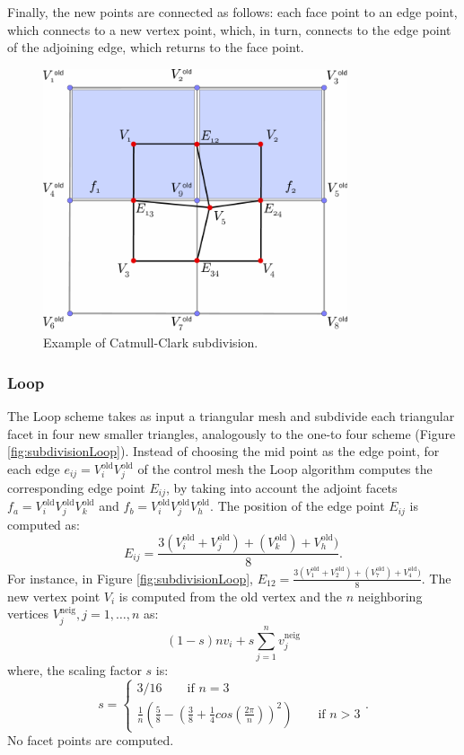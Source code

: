 Finally, the new points are connected as follows: each face point to an edge point, which connects to a new vertex point, which, in turn, connects to the edge point of the adjoining edge, which returns to the face point.


\begin{figure}
\begin{center}
\centering
  \includegraphics[width=0.8\textwidth]{./img/subdivisionCatmull}
 \caption{Example of Catmull-Clark subdivision.}
 \label{fig:subdivisionCatmull}
\end{center}
\end{figure}

\subsubsection{Loop}
The Loop scheme takes as input a triangular mesh and subdivide each triangular facet in four new smaller triangles, analogously to the one-to four scheme (Figure \ref{fig:subdivisionLoop}).
Instead of choosing the mid point as the edge point, for each edge  $e_{ij} = V_i^{\text{old}}V_j^{\text{old}}$ of the control mesh the Loop algorithm computes the corresponding edge point $E_{ij}$, by taking into account the adjoint facets $f_{a} = V_i^{\text{old}}V_j^{\text{old}}V_k^{\text{old}}$ and $f_{b} = V_i^{\text{old}}V_j^{\text{old}}V_h^{\text{old}}$. The position of the edge point $E_{ij}$ is computed as:
\[
E_{ij} = \frac{3(V_i^{\text{old}} + V_j^{\text{old}}) + (V_k^{\text{old}}) + V_h^{\text{old}}) }{8}.
\]
For instance, in Figure \ref{fig:subdivisionLoop}, $E_{12} = \frac{3(V_1^{\text{old}} + V_2^{\text{old}}) + (V_7^{\text{old}}) + V_4^{\text{old}}) }{8}$.
The new vertex point $V_i$ is computed from the old vertex and the $n$ neighboring vertices $V_j^{\text{neig}}, j = 1,\dots, n$ as:
\[
(1-s) n v_i + s \sum_{j=1}^n v_j^{\text{neig}}
\]
where, the scaling factor $s$ is:
\[
s=
\begin{cases}
  3/16 \qquad \text{if $n = 3$}\\
  \frac{1}{n} \left(\frac{5}{8} - \left(\frac{3}{8} + \frac{1}{4} cos\left(\frac{2\pi}{n}\right)\right)^2\right) \qquad \text{if $n > 3$}
\end{cases}
.
\]
No facet points are computed.

